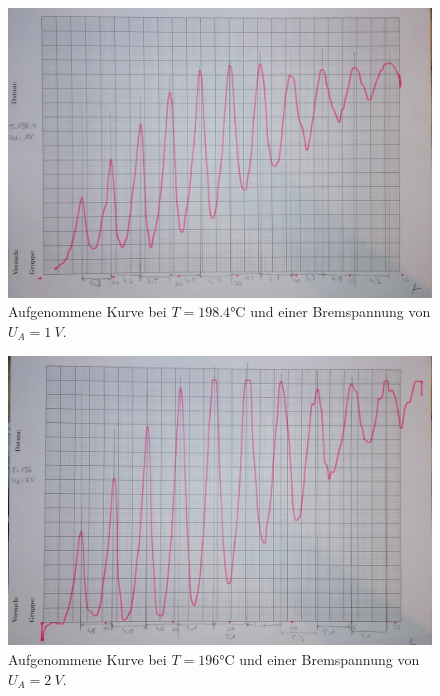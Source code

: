 \begin{figure}[H]
    \centering
    \includegraphics[scale=0.25]{content/Kurve198.jpg}
    \caption{Aufgenommene Kurve bei $T = 198.4\unit{\degreeCelsius}$ und einer Bremspannung von $U_A = \qty{1}{V}$.}
    \label{fig:198}
\end{figure}

\begin{figure}[H]
    \centering
    \includegraphics[scale=0.25]{content/Kurve196.jpg}
    \caption{Aufgenommene Kurve bei $T = 196\unit{\degreeCelsius}$ und einer Bremspannung von $U_A = \qty{2}{V}$.}
    \label{fig:196}
\end{figure}

